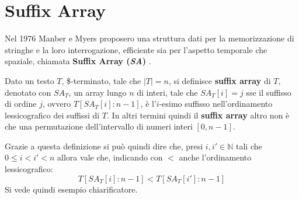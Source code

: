 \section{Suffix Array}
Nel 1976 Manber e Myers proposero una struttura dati per la memorizzazione di
stringhe e la loro interrogazione, efficiente sia per
l'aspetto temporale che spaziale, chiamata \textbf{Suffix Array (\textit{SA})}
\cite{sa}.
\begin{definizione}
  Dato un testo $T$, \$-terminato, tale che $|T|=n$, si definisce \textbf{suffix
    array} di $T$, denotato con $SA_T$, un array lungo $n$ di interi, tale che
  $SA_T[i]=j$ sse il suffisso di ordine $j$, ovvero $T[SA_T[i]:n-1]$, è
  l'$i$-esimo suffisso nell’ordinamento lessicografico dei suffissi di $T$. In
  altri termini quindi il \textbf{suffix array} altro non è che una permutazione
  dell'intervallo di numeri interi $[0,n-1]$.
\end{definizione}
Grazie a questa definizione si può quindi dire che, presi $i,i'\in \mathbb{N}$
tali che $0\leq i < i' < n$ allora vale che, indicando con $<$ anche
l'ordinamento lessicografico:
\[T[SA_T[i]:n-1] < T[SA_T[i']:n-1]\]
Si vede quindi esempio chiarificatore.
